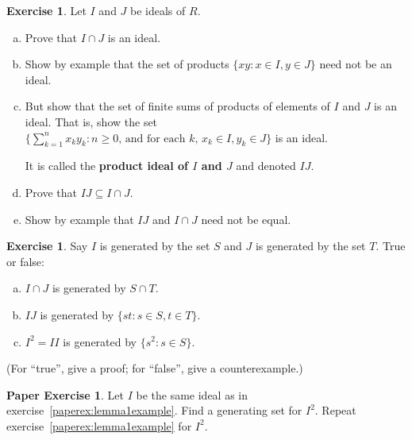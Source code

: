 \documentclass{amsart}
\theoremstyle{plain}
\theoremstyle{definition}
\newtheorem{exercise}[theorem]{Exercise}
\newtheorem{paperexercise}[theorem]{Paper Exercise}
\theoremstyle{definition}
\newcommand{\defining}[1]{\textbf{#1}}
\DeclareMathOperator{\radname}{rad}
\newcommand{\rad}[1]{\radname(#1)}
\begin{document}
\begin{exercise} \label{exer:product ideal} %
Let $I$ and $J$ be ideals of $R$.
\begin{enumerate}[a.]
\item Prove that $I \cap J$ is an ideal.

\item Show by example that the set of products $\{xy : x \in I, y \in J \}$ need not be an ideal.

\item But show that the set of finite sums
of products of elements of $I$ and $J$ is an ideal.
That is, show the set
$\{ \sum_{k=1}^{n} x_k y_k : \text{$n \geq 0$, and for each $k$, $x_k \in I, y_k \in J$} \}$
is an ideal.

It is called the \defining{product ideal of $I$ and $J$} and denoted $IJ$.

\item Prove that $IJ \subseteq I \cap J$.

\item Show by example that $IJ$ and $I \cap J$ need not be equal.
\end{enumerate}
\end{exercise}



\begin{exercise} \label{exer:generating sets}
Say $I$ is generated by the set $S$ and $J$ is generated by the set $T$.
True or false:
\begin{enumerate}[a.]
\item $I \cap J$ is generated by $S \cap T$.
\item $I J$ is generated by $\{ s t : s \in S, t \in T \}$.
\item $I^2 = II$ is generated by $\{ s^2 : s \in S \}$.
\end{enumerate}
(For ``true'', give a proof; for ``false'', give a counterexample.)
\end{exercise}



\begin{paperexercise}
Let $I$ be the same ideal as in exercise~\ref{paperex:lemma1example}.
Find a generating set for $I^2$.
Repeat exercise~\ref{paperex:lemma1example} for $I^2$.
\end{paperexercise}



\end{document}
